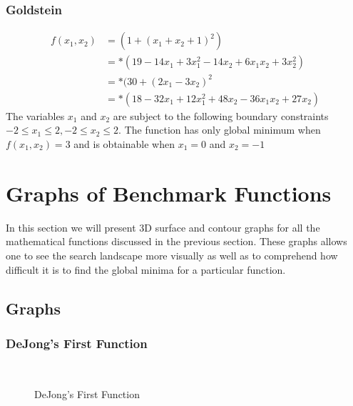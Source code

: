 \subsubsection{Goldstein}
\begin{align}
	f(x_1,x_2) &= (1 + (x_1 + x_2 + 1)^2)\nonumber\\
			   &=*(19-14x_1+3x_1^2 -14x_2 + 6x_1x_2 + 3x_2^2)\nonumber\\
			   &=*(30 + (2x_1 -3x_2)^2\nonumber\\
			   &=*(18 - 32x_1 + 12x_1^2 +48x_2 -36x_1x_2 + 27x_2)\nonumber
\end{align}
The variables $x_1$ and $x_2$ are subject to the following boundary constraints $-2 \leq x_1 \leq 2, -2 \leq x_2 \leq 2$. The function has only global minimum when $f(x_1,x_2) = 3$ and is obtainable when $x_1 = 0$ and $x_2 = -1$
\section{Graphs of Benchmark Functions}
In this section we will present 3D surface and contour graphs for all the mathematical functions discussed in the previous section. These graphs allows one to see the search landscape more visually as well as to comprehend how difficult it is to find the global minima for a particular function.

\subsection{Graphs}
\subsubsection{DeJong's First Function}
~
\begin{figure}[ht]
	\centering
	\setlength \fboxsep{0pt}
	\setlength \fboxrule{0.5pt}
	\caption{DeJong's First Function}
	\label{fig:DeJongF1Graph}
\end{figure}
~
